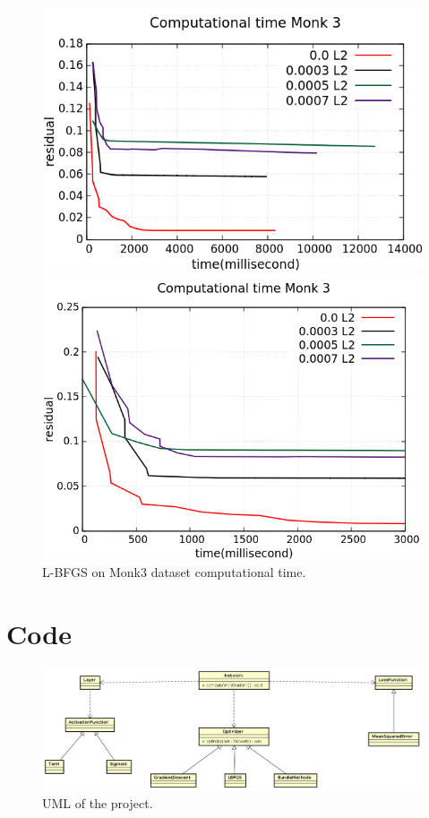 \begin{figure}[H]
	\centering
	\begin{minipage}[t]{0.5\linewidth}
		\includegraphics[width=\linewidth]{data/LBFGS/Monk3/Monk3_LBFGS_L2_CT_standard.png}
	\end{minipage}%
	\begin{minipage}[t]{0.5\linewidth}
		\includegraphics[width=\linewidth]{data/LBFGS/Monk3/Monk3_LBFGS_L2_CT_zoom.png}
	\end{minipage}
	\caption{L-BFGS on Monk3 dataset computational time.}
\end{figure}



\section{Code}
\begin{figure}[H]
	\centering
	\includegraphics[width=\linewidth]{img/uml.jpg}
	\caption{UML of the project.}
\end{figure}
\newpage
